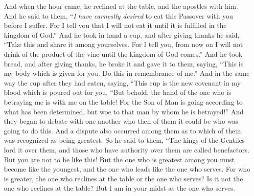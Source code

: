 \begin{biblechapter}
 And when the hour came, he reclined at the table, and the apostles with him.
\verse And he said to them, “\textit{I have earnestly desired} to eat this Passover with you before I suffer.
\verse For I tell you that I will not eat it until it is fulfilled in the kingdom of God.”
\verse And he took in hand a cup, and after giving thanks he said, “Take this and share it among yourselves.
\verse For I tell you, from now on I will not drink of the product of the vine until the kingdom of God comes.”
\verse And he took bread, and after giving thanks, he broke it and gave it to them, saying, “This is my body which is given for you. Do this in remembrance of me.”
\verse And in the same way the cup after they had eaten, saying, “This cup is the new covenant in my blood which is poured out for you.
\verse “But behold, the hand of the one who is betraying me is with me on the table!
\verse For the Son of Man is going according to what has been determined, but woe to that man by whom he is betrayed!”
\verse And they began to debate with one another who then of them it could be who was going to do this.
 And a dispute also occurred among them as to which of them was recognized as being greatest.
\verse So he said to them, “The kings of the Gentiles lord it over them, and those who have authority over them are called benefactors.
\verse But you are not to be like this! But the one who is greatest among you must become like the youngest, and the one who leads like the one who serves.
\verse For who is greater, the one who reclines at the table or the one who serves? Is it not the one who reclines at the table? But I am in your midst as the one who serves.

\end{biblechapter}
